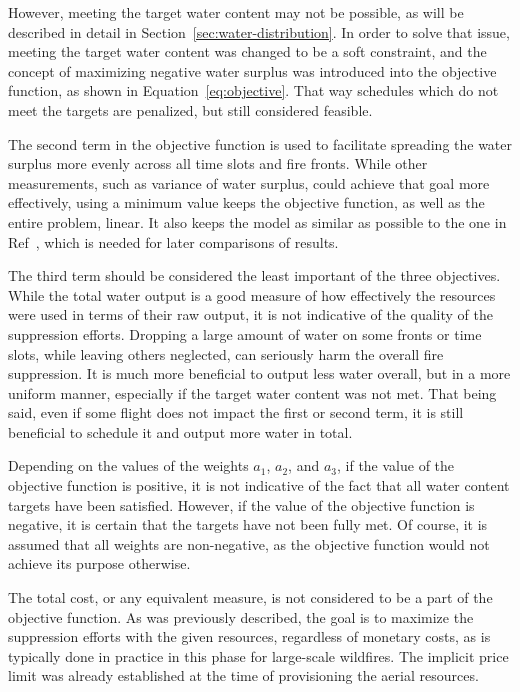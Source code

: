 However, meeting the target water content may not be possible, as will be described in detail in Section~\ref{sec:water-distribution}.
In order to solve that issue, meeting the target water content was changed to be a soft constraint, and the concept of maximizing negative water surplus was introduced into the objective function, as shown in Equation~\ref{eq:objective}.
That way schedules which do not meet the targets are penalized, but still considered feasible.

The second term in the objective function is used to facilitate spreading the water surplus more evenly across all time slots and fire fronts.
While other measurements, such as variance of water surplus, could achieve that goal more effectively, using a minimum value keeps the objective function, as well as the entire problem, linear.
It also keeps the model as similar as possible to the one in Ref~\cite{SkorinKapov/ILP}, which is needed for later comparisons of results.

The third term should be considered the least important of the three objectives.
While the total water output is a good measure of how effectively the resources were used in terms of their raw output, it is not indicative of the quality of the suppression efforts.
Dropping a large amount of water on some fronts or time slots, while leaving others neglected, can seriously harm the overall fire suppression.
It is much more beneficial to output less water overall, but in a more uniform manner, especially if the target water content was not met.
That being said, even if some flight does not impact the first or second term, it is still beneficial to schedule it and output more water in total.

Depending on the values of the weights $a_1$, $a_2$, and $a_3$, if the value of the objective function is positive, it is not indicative of the fact that all water content targets have been satisfied.
However, if the value of the objective function is negative, it is certain that the targets have not been fully met.
Of course, it is assumed that all weights are non-negative, as the objective function would not achieve its purpose otherwise.

The total cost, or any equivalent measure, is not considered to be a part of the objective function.
As was previously described, the goal is to maximize the suppression efforts with the given resources, regardless of monetary costs, as is typically done in practice in this phase for large-scale wildfires.
The implicit price limit was already established at the time of provisioning the aerial resources.


